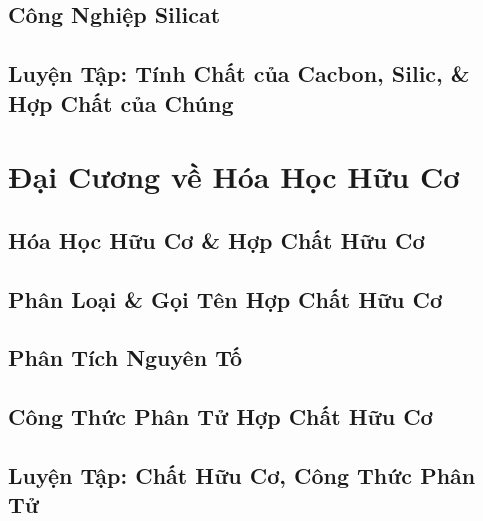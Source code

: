 \documentclass[oneside]{book}
\numberwithin{equation}{section}
\begin{document}

\section{Công Nghiệp Silicat}


\section{Luyện Tập: Tính Chất của Cacbon, Silic, \& Hợp Chất của Chúng}


\chapter{Đại Cương về Hóa Học Hữu Cơ}

\section{Hóa Học Hữu Cơ \& Hợp Chất Hữu Cơ}


\section{Phân Loại \& Gọi Tên Hợp Chất Hữu Cơ}


\section{Phân Tích Nguyên Tố}


\section{Công Thức Phân Tử Hợp Chất Hữu Cơ}


\section{Luyện Tập: Chất Hữu Cơ, Công Thức Phân Tử}
\end{document}

